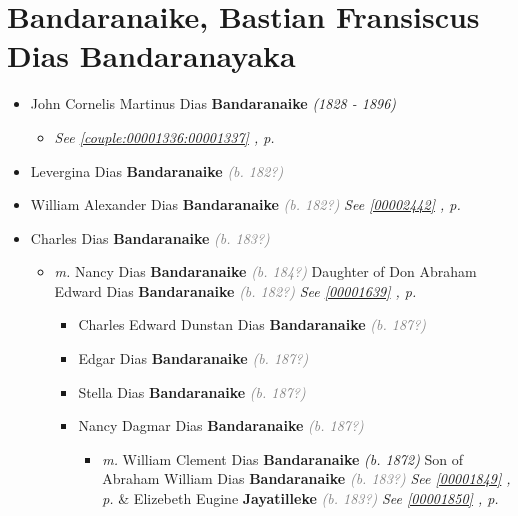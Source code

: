 \documentclass[10pt, openany]{book}
\begin{document}
\chapter{Bandaranaike, Bastian Fransiscus Dias Bandaranayaka}
\label{00001198}
\textcolor{slmaroon}{\textit{}}
\begin{itemize}
\item{John Cornelis Martinus Dias \textbf{Bandaranaike} \textcolor{slorange}{\textit{(1828 - 1896)}}
\begin{itemize}
\item{\textcolor{slteal}{\textit{See  \autoref{couple:00001336:00001337} \textit{, p. \pageref{couple:00001336:00001337} }}}}
\end{itemize}
    }
\item{Levergina Dias \textbf{Bandaranaike} \textcolor{gray}{\textit{(b. 182?)}}
  }
\item{William Alexander Dias \textbf{Bandaranaike} \textcolor{gray}{\textit{(b. 182?)}} \textcolor{slteal}{\textit{See  \autoref{00002442} \textit{, p. \pageref{00002442} }}}}
\item{Charles Dias \textbf{Bandaranaike} \textcolor{gray}{\textit{(b. 183?)}}
\begin{itemize}
\item{\textit{m.} Nancy Dias \textbf{Bandaranaike} \textcolor{gray}{\textit{(b. 184?)}} Daughter of  Don Abraham Edward Dias \textbf{Bandaranaike} \textcolor{gray}{\textit{(b. 182?)}} \textcolor{slteal}{\textit{See  \autoref{00001639} \textit{, p. \pageref{00001639} }}}   \label{couple:00001640:00001641} \begin{itemize}
\item{Charles Edward Dunstan Dias \textbf{Bandaranaike} \textcolor{gray}{\textit{(b. 187?)}}
    }
\item{Edgar Dias \textbf{Bandaranaike} \textcolor{gray}{\textit{(b. 187?)}}
  }
\item{Stella Dias \textbf{Bandaranaike} \textcolor{gray}{\textit{(b. 187?)}}
  }
\item{Nancy Dagmar Dias \textbf{Bandaranaike} \textcolor{gray}{\textit{(b. 187?)}}
\begin{itemize}
\item{\textit{m.} William Clement Dias \textbf{Bandaranaike} \textcolor{slorange}{\textit{(b. 1872)}} Son of  Abraham William Dias \textbf{Bandaranaike} \textcolor{gray}{\textit{(b. 183?)}} \textcolor{slteal}{\textit{See  \autoref{00001849} \textit{, p. \pageref{00001849} }}}  \&  Elizebeth Eugine \textbf{Jayatilleke} \textcolor{gray}{\textit{(b. 183?)}} \textcolor{slteal}{\textit{See  \autoref{00001850} \textit{, p. \pageref{00001850} }}}   \label{couple:00001925:00001926} \begin{itemize}

\end{itemize}}
\end{itemize}}
\end{itemize}}
\end{itemize}}
\end{itemize}
\end{document}
